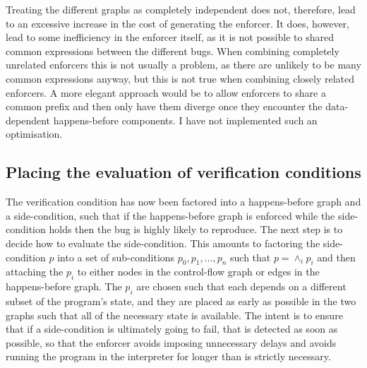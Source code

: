 
Treating the different graphs as completely independent does not,
therefore, lead to an excessive increase in the cost of generating the
enforcer.  It does, however, lead to some inefficiency in the enforcer
itself, as it is not possible to shared common expressions between the
different bugs.  When combining completely unrelated enforcers this is
not usually a problem, as there are unlikely to be many common
expressions anyway, but this is not true when combining closely
related enforcers.  A more elegant approach would be to allow
enforcers to share a common prefix and then only have them diverge
once they encounter the data-dependent happens-before components.  I
have not implemented such an optimisation.

\subsection{Placing the evaluation of verification conditions}
\label{sect:enforce:place_vcs}

The verification condition has now been factored into a happens-before
graph and a side-condition, such that if the happens-before graph is
enforced while the side-condition holds then the bug is highly likely
to reproduce.  The next step is to decide how to evaluate the
side-condition.  This amounts to factoring the side-condition $p$ into
a set of sub-conditions $p_0, p_1, {\ldots}, p_n$ such that $p =
\wedge_i p_i$ and then attaching the $p_i$ to either nodes in the
control-flow graph or edges in the happens-before graph.  The $p_i$
are chosen such that each depends on a different subset of the
program's state, and they are placed as early as possible in the two
graphs such that all of the necessary state is available.  The intent
is to ensure that if a side-condition is ultimately going to fail,
that is detected as soon as possible, so that the enforcer avoids
imposing unnecessary delays and avoids running the program in the
interpreter for longer than is strictly necessary.

